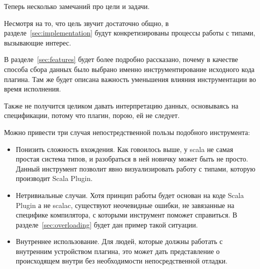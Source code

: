 Теперь несколько замечаний про цели и задачи.

Несмотря на то, что цель звучит достаточно общно, в
разделе~\ref{sec:implementation} будут конкретизированы процессы работы с типами,
вызывающие интерес.

В разделе~\ref{sec:features} будет более подробно
рассказано, почему в качестве способа сбора данных было выбрано именно
инструментирование исходного кода плагина.
Там же будет описана важность уменьшения влияния инструментации во время исполнения.

Также не получится целиком давать интерпретацию данных, основываясь на спецификации,
потому что плагин, порою, ей не следует.

Можно привести три случая непостредственной пользы подобного инструмента:
\begin{itemize}
  \item Понизить сложность вхождения.
  Как говоилось выше, у scala не самая простая система типов, и разобраться
  в ней новичку может быть не просто.
  Данный инструмент позволит явно визуализировать работу с типами, которую
  производит Scala Plugin.
  \item Нетривиальные случаи.
  Хотя принцип работы будет основан на коде Scala Plugin а не scalac,
  существуют неочевидные ошибки, не завязанные на специфике компилятора, с которыми
  инструмент поможет справиться.
  В разделе~\ref{sec:overloading} будет дан пример такой ситуации.
  \item Внутреннее использование.
  Для людей, которые должны работать с внутренним устройством плагина, это может
  дать представление о происходящем внутри без необходимости непосредственной
  отладки.
\end{itemize}
